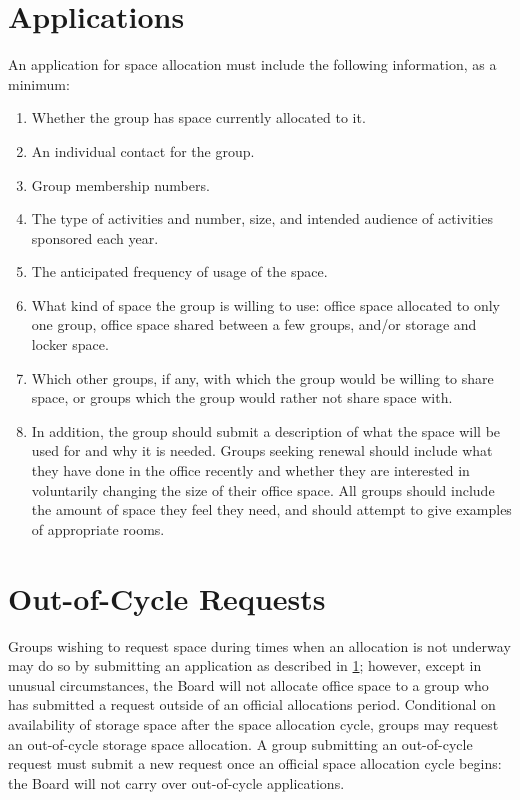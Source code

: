 \documentclass[12pt]{article}
\begin{document}
\section{Applications}
\label{space_apps}
An application for space allocation must include the following information, as a minimum:
\begin{enumerate}
    \item Whether the group has space currently allocated to it.
    \item An individual contact for the group.
    \item Group membership numbers.
    \item The type of activities and number, size, and intended audience of activities sponsored each year.
    \item The anticipated frequency of usage of the space.
    \item What kind of space the group is willing to use: office space allocated to only one group,
        office space shared between a few groups, and/or storage and locker space.
    \item Which other groups, if any, with which the group would be willing to share space, or
        groups which the group would rather not share space with.
    \item In addition, the group should submit a description of what the space will be used for and why
        it is needed.
    Groups seeking renewal should include what they have done in the office recently and whether they are
        interested in voluntarily changing the size of their office space.
    All groups should include the amount of space they feel they need, and should attempt to
        give examples of appropriate rooms.
\end{enumerate}

\section{Out-of-Cycle Requests}
Groups wishing to request space during times when an allocation is not underway may do so by
    submitting an application as described in \ref{space_apps}; however, except in unusual circumstances, the
    Board will not allocate office space to a group who has submitted a request outside of an official
    allocations period.
Conditional on availability of storage space after the space allocation cycle, groups may request
    an out-of-cycle storage space allocation.
A group submitting an out-of-cycle request must submit a new request once an official space allocation cycle
    begins: the Board will not carry over out-of-cycle applications.
\end{document}
